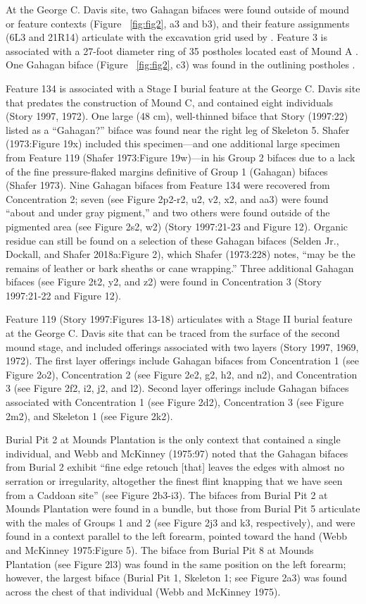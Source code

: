 \documentclass[review]{elsarticle}
\begin{document}
At the George C. Davis site, two Gahagan bifaces were found outside of mound or feature contexts (Figure ~\ref{fig:fig2}, a3 and b3), and their feature assignments (6L3 and 21R14) articulate with the excavation grid used by \cite{RN800}. Feature 3 is associated with a 27-foot diameter ring of 35 postholes located east of Mound A \citep[Figure 4]{RN800}. One Gahagan biface (Figure ~\ref{fig:fig2}, c3) was found in the outlining postholes \cite{RN800}.

Feature 134 is associated with a Stage I burial feature at the George C. Davis site that predates the construction of Mound C, and contained eight individuals (Story 1997, 1972). One large (48 cm), well-thinned biface that Story (1997:22) listed as a “Gahagan?” biface was found near the right leg of Skeleton 5. Shafer (1973:Figure 19x) included this specimen—and one additional large specimen from Feature 119 (Shafer 1973:Figure 19w)—in his Group 2 bifaces due to a lack of the fine pressure-flaked margins definitive of Group 1 (Gahagan) bifaces (Shafer 1973). Nine Gahagan bifaces from Feature 134 were recovered from Concentration 2; seven (see Figure 2p2-r2, u2, v2, x2, and aa3) were found “about and under gray pigment,” and two others were found outside of the pigmented area (see Figure 2s2, w2) (Story 1997:21-23 and Figure 12). Organic residue can still be found on a selection of these Gahagan bifaces (Selden Jr., Dockall, and Shafer 2018a:Figure 2), which Shafer (1973:228) notes, “may be the remains of leather or bark sheaths or cane wrapping.” Three additional Gahagan bifaces (see Figure 2t2, y2, and z2) were found in Concentration 3 (Story 1997:21-22 and Figure 12).

Feature 119 (Story 1997:Figures 13-18) articulates with a Stage II burial feature at the George C. Davis site that can be traced from the surface of the second mound stage, and included offerings associated with two layers (Story 1997, 1969, 1972). The first layer offerings include Gahagan bifaces from Concentration 1 (see Figure 2o2), Concentration 2 (see Figure 2e2, g2, h2, and n2), and Concentration 3 (see Figure 2f2, i2, j2, and l2). Second layer offerings include Gahagan bifaces associated with Concentration 1 (see Figure 2d2), Concentration 3 (see Figure 2m2), and Skeleton 1 (see Figure 2k2). 

Burial Pit 2 at Mounds Plantation is the only context that contained a single individual, and Webb and McKinney (1975:97) noted that the Gahagan bifaces from Burial 2 exhibit “fine edge retouch [that] leaves the edges with almost no serration or irregularity, altogether the finest flint knapping that we have seen from a Caddoan site” (see Figure 2b3-i3). The bifaces from Burial Pit 2 at Mounds Plantation were found in a bundle, but those from Burial Pit 5 articulate with the males of Groups 1 and 2 (see Figure 2j3 and k3, respectively), and were found in a context parallel to the left forearm, pointed toward the hand (Webb and McKinney 1975:Figure 5). The biface from Burial Pit 8 at Mounds Plantation (see Figure 2l3) was found in the same position on the left forearm; however, the largest biface (Burial Pit 1, Skeleton 1; see Figure 2a3) was found across the chest of that individual (Webb and McKinney 1975).
\end{document}
